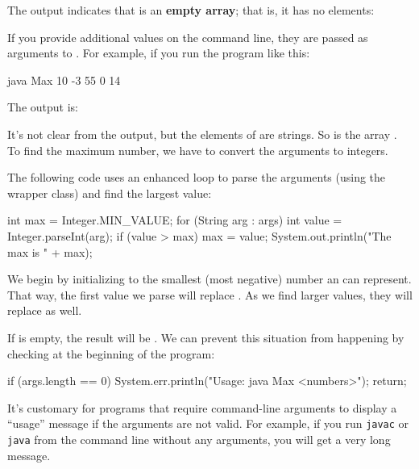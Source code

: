 
The output indicates that  is an {\bf empty array}; that is, it has no elements:

\begin{stdout}
[]
\end{stdout}

If you provide additional values on the command line, they are passed as arguments to .
For example, if you run the program like this:

\begin{stdout}
java Max 10 -3 55 0 14
\end{stdout}

The output is:

\begin{stdout}
[10, -3, 55, 0, 14]
\end{stdout}

It's not clear from the output, but the elements of  are strings.
So  is the array .
To find the maximum number, we have to convert the arguments to integers.


The following code uses an enhanced  loop to parse the arguments (using the  wrapper class) and find the largest value:

\begin{code}
int max = Integer.MIN_VALUE;
for (String arg : args) {
    int value = Integer.parseInt(arg);
    if (value > max) {
        max = value;
    }
}
System.out.println("The max is " + max);
\end{code}

We begin by initializing  to the smallest (most negative) number an  can represent.
That way, the first value we parse will replace .
As we find larger values, they will replace  as well.

If  is empty, the result will be .
We can prevent this situation from happening by checking  at the beginning of the program:

\begin{code}
if (args.length == 0) {
    System.err.println("Usage: java Max <numbers>");
    return;
}
\end{code}

It's customary for programs that require command-line arguments to display a ``usage'' message if the arguments are not valid.
For example, if you run {\tt javac} or {\tt java} from the command line without any arguments, you will get a very long message.


